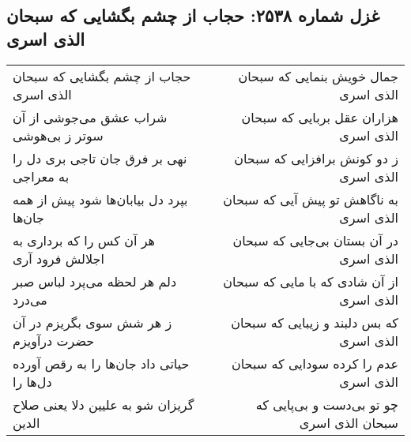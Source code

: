 \begin{center}
\section*{غزل شماره ۲۵۳۸: حجاب از چشم بگشایی که سبحان الذی اسری}
\label{sec:2538}
\begin{longtable}{l p{0.5cm} r}
حجاب از چشم بگشایی که سبحان الذی اسری
&&
جمال خویش بنمایی که سبحان الذی اسری
\\
شراب عشق می‌جوشی از آن سوتر ز بی‌هوشی
&&
هزاران عقل بربایی که سبحان الذی اسری
\\
نهی بر فرق جان تاجی بری دل را به معراجی
&&
ز دو کونش برافزایی که سبحان الذی اسری
\\
بپرد دل بیابان‌ها شود پیش از همه جان‌ها
&&
به ناگاهش تو پیش آیی که سبحان الذی اسری
\\
هر آن کس را که برداری به اجلالش فرود آری
&&
در آن بستان بی‌جایی که سبحان الذی اسری
\\
دلم هر لحظه می‌پرد لباس صبر می‌درد
&&
از آن شادی که با مایی که سبحان الذی اسری
\\
ز هر شش سوی بگریزم در آن حضرت درآویزم
&&
که بس دلبند و زیبایی که سبحان الذی اسری
\\
حیاتی داد جان‌ها را به رقص آورده دل‌ها را
&&
عدم را کرده سودایی که سبحان الذی اسری
\\
گریزان شو به علیین دلا یعنی صلاح الدین
&&
چو تو بی‌دست و بی‌پایی که سبحان الذی اسری
\\
\end{longtable}
\end{center}
